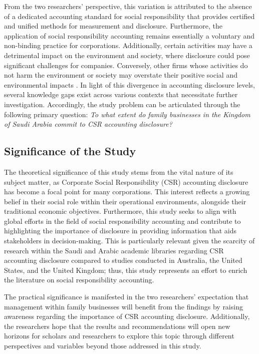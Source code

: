 \documentclass[10pt]{NSP1}
\begin{document}
From the two researchers' perspective, this variation is attributed to the absence of a dedicated accounting standard for social responsibility that provides certified and unified methods for measurement and disclosure. Furthermore, the application of social responsibility accounting remains essentially a voluntary and non-binding practice for corporations. Additionally, certain activities may have a detrimental impact on the environment and society, where disclosure could pose significant challenges for companies. Conversely, other firms whose activities do not harm the environment or society may overstate their positive social and environmental impacts \cite{Bayoud2012}. In light of this divergence in accounting disclosure levels, several knowledge gaps exist across various contexts that necessitate further investigation. Accordingly, the study problem can be articulated through the following primary question: \emph{To what extent do family businesses in the Kingdom of Saudi Arabia commit to CSR accounting disclosure?}

\subsection{Significance of the Study}

The theoretical significance of this study stems from the vital nature of its subject matter, as Corporate Social Responsibility (CSR) accounting disclosure has become a focal point for many corporations. This interest reflects a growing belief in their social role within their operational environments, alongside their traditional economic objectives. Furthermore, this study seeks to align with global efforts in the field of social responsibility accounting and contribute to highlighting the importance of disclosure in providing information that aids stakeholders in decision-making. This is particularly relevant given the scarcity of research within the Saudi and Arabic academic libraries regarding CSR accounting disclosure compared to studies conducted in Australia, the United States, and the United Kingdom; thus, this study represents an effort to enrich the literature on social responsibility accounting.

The practical significance is manifested in the two researchers' expectation that management within family businesses will benefit from the findings by raising awareness regarding the importance of CSR accounting disclosure. Additionally, the researchers hope that the results and recommendations will open new horizons for scholars and researchers to explore this topic through different perspectives and variables beyond those addressed in this study.
\end{document}
